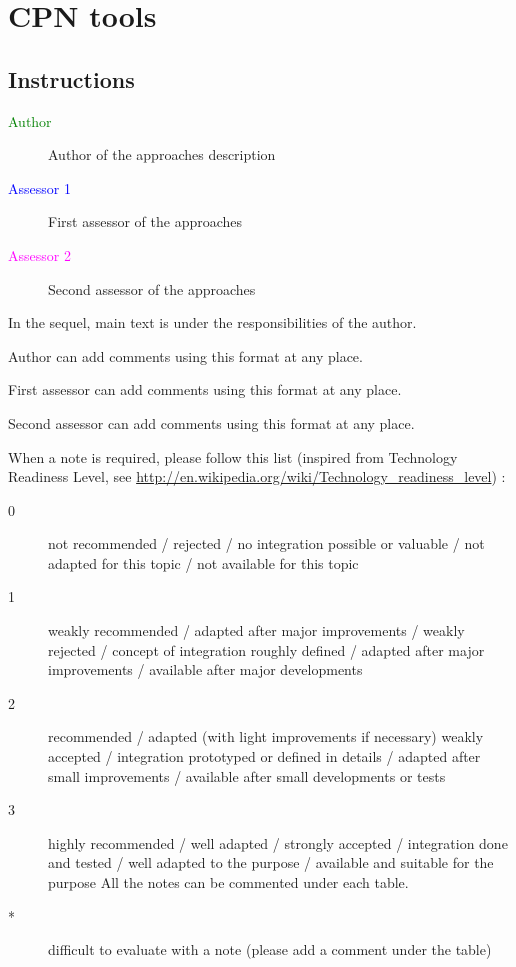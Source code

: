 \chapter{CPN tools}
\label{sec:cpntools}

\section{Instructions}

\begin{description}
\item[\textcolor{green}{Author}] Author of the approaches description  
\item[\textcolor{blue}{Assessor 1}] First assessor of the approaches 
\item[\textcolor{magenta}{Assessor 2}] Second assessor of the approaches 
\end{description}

In the sequel, main text is under the responsibilities of the author.

\begin{author_comment}
Author can add comments using this format at any place.
\end{author_comment}

\begin{assessor1}
First assessor can add comments using this format at any place.
\end{assessor1}

\begin{assessor2}
Second assessor can add comments using this format at any place.
\end{assessor2}

When a note is required, please follow this list (inspired from Technology Readiness Level, see \url{http://en.wikipedia.org/wiki/Technology\_readiness\_level}) :

\begin{description}
\item[0] not recommended / rejected / no integration possible or valuable / not adapted for this topic / not available for this topic
\item[1] weakly recommended / adapted after major improvements / weakly rejected / concept of integration roughly defined / adapted after major improvements / available after major developments
\item[2] recommended / adapted (with light improvements if necessary)  weakly accepted / integration prototyped or defined in details / adapted after small improvements / available after small developments or tests
\item[3] highly recommended / well adapted / strongly accepted / integration done and tested / well adapted to the purpose / available and suitable for the purpose All the notes can be commented under each table.
\item[*] difficult to evaluate with a note (please add a comment under the table)
\end{description}


